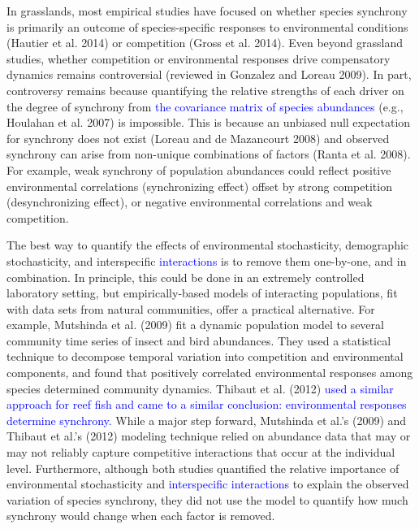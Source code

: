 \documentclass[12pt,]{article}
\begin{document}
In grasslands, most empirical studies have focused on whether species
synchrony is primarily an outcome of species-specific responses to
environmental conditions (Hautier et al. 2014) or competition (Gross et
al. 2014). Even beyond grassland studies, whether competition or
environmental responses drive compensatory dynamics remains
controversial (reviewed in Gonzalez and Loreau 2009). In part,
controversy remains because quantifying the relative strengths of each
driver on the degree of synchrony from
\textcolor{blue}{the covariance matrix of species abundances} (e.g.,
Houlahan et al. 2007) is impossible. This is because an unbiased null
expectation for synchrony does not exist (Loreau and {{de Mazancourt}}
2008) and observed synchrony can arise from non-unique combinations of
factors (Ranta et al. 2008). For example, weak synchrony of population
abundances could reflect positive environmental correlations
(synchronizing effect) offset by strong competition (desynchronizing
effect), or negative environmental correlations and weak competition.

The best way to quantify the effects of environmental stochasticity,
demographic stochasticity, and interspecific
\textcolor{blue}{interactions} is to remove them one-by-one, and in
combination. In principle, this could be done in an extremely controlled
laboratory setting, but empirically-based models of interacting
populations, fit with data sets from natural communities, offer a
practical alternative. For example, Mutshinda et al. (2009) fit a
dynamic population model to several community time series of insect and
bird abundances. They used a statistical technique to decompose temporal
variation into competition and environmental components, and found that
positively correlated environmental responses among species determined
community dynamics. Thibaut et al. (2012)
\textcolor{blue}{used a similar approach for reef fish and came to a similar conclusion: environmental responses determine synchrony.}
While a major step forward, Mutshinda et al.'s (2009) and Thibaut et
al.'s (2012) modeling technique relied on abundance data that may or may
not reliably capture competitive interactions that occur at the
individual level. Furthermore, although both studies quantified the
relative importance of environmental stochasticity and
\textcolor{blue}{interspecific interactions} to explain the observed
variation of species synchrony, they did not use the model to quantify
how much synchrony would change when each factor is removed.
\end{document}
